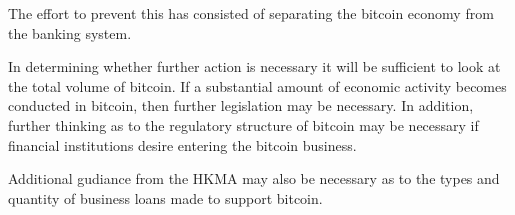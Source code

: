 The effort to prevent this has consisted of separating the bitcoin
economy from the banking system.  

In determining whether further action is necessary it will be
sufficient to look at the total volume of bitcoin.  If a substantial
amount of economic activity becomes conducted in bitcoin, then further
legislation may be necessary.  In addition, further thinking as to the
regulatory structure of bitcoin may be necessary if financial
institutions desire entering the bitcoin business.

Additional gudiance from the HKMA may also be necessary as to the
types and quantity of business loans made to support bitcoin.



